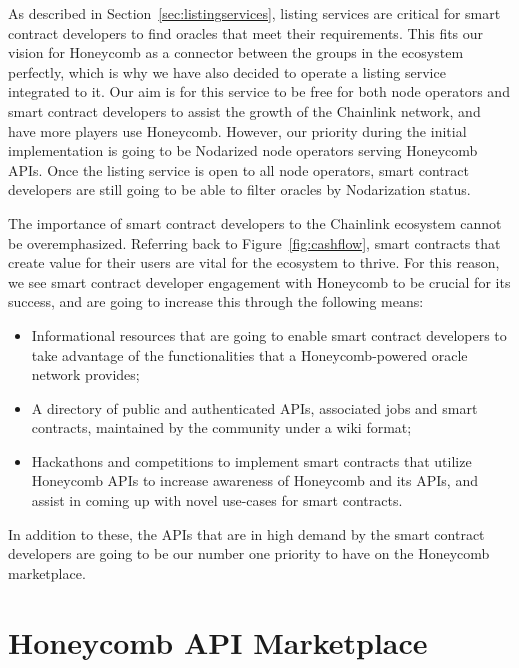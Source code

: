 \documentclass[12pt]{article}
\begin{document}
As described in Section~\ref{sec:listingservices}, listing services are critical for smart contract developers to find oracles that meet their requirements.
This fits our vision for Honeycomb as a connector between the groups in the ecosystem perfectly, which is why we have also decided to operate a listing service integrated to it.
Our aim is for this service to be free for both node operators and smart contract developers to assist the growth of the Chainlink network, and have more players use Honeycomb.
However, our priority during the initial implementation is going to be Nodarized node operators serving Honeycomb APIs.
Once the listing service is open to all node operators, smart contract developers are still going to be able to filter oracles by Nodarization status.

The importance of smart contract developers to the Chainlink ecosystem cannot be overemphasized.
Referring back to Figure~\ref{fig:cashflow}, smart contracts that create value for their users are vital for the ecosystem to thrive.
For this reason, we see smart contract developer engagement with Honeycomb to be crucial for its success, and are going to increase this through the following means:
\begin{itemize}
	\item Informational resources that are going to enable smart contract developers to take advantage of the functionalities that a Honeycomb-powered oracle network provides;
	\item A directory of public and authenticated APIs, associated jobs and smart contracts, maintained by the community under a wiki format;
	\item Hackathons and competitions to implement smart contracts that utilize Honeycomb APIs to increase awareness of Honeycomb and its APIs, and assist in coming up with novel use-cases for smart contracts.
\end{itemize}
In addition to these, the APIs that are in high demand by the smart contract developers are going to be our number one priority to have on the Honeycomb marketplace.


\section{Honeycomb API Marketplace}
\label{sec:honeycombapimarketplace}
\end{document}
